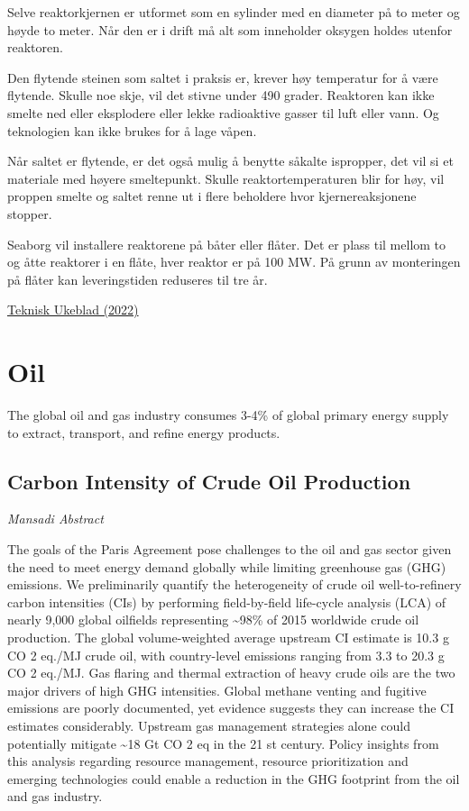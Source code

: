 \documentclass[
]{book}
\begin{document}
Selve reaktorkjernen er utformet som en sylinder med en diameter på to meter og høyde to meter. Når den er i drift må alt som inneholder oksygen holdes utenfor reaktoren.

Den flytende steinen som saltet i praksis er, krever høy temperatur for å være flytende. Skulle noe skje, vil det stivne under 490 grader. Reaktoren kan ikke smelte ned eller eksplodere eller lekke radioaktive gasser til luft eller vann. Og teknologien kan ikke brukes for å lage våpen.

Når saltet er flytende, er det også mulig å benytte såkalte ispropper, det vil si et materiale med høyere smeltepunkt. Skulle reaktortemperaturen blir for høy, vil proppen smelte og saltet renne ut i flere beholdere hvor kjernereaksjonene stopper.

Seaborg vil installere reaktorene på båter eller flåter.
Det er plass til mellom to og åtte reaktorer i en flåte, hver reaktor er på 100 MW. På grunn av monteringen på flåter kan leveringstiden reduseres til tre år.

\href{https://www.tu.no/artikler/seaborg-utvikler-mobile-kjernekraftverk/516722}{Teknisk Ukeblad (2022)}

\hypertarget{oil}{%
\chapter{Oil}\label{oil}}

The global oil and gas industry consumes 3-4\% of global primary energy supply to extract,
transport, and refine energy products.

\hypertarget{carbon-intensity-of-crude-oil-production}{%
\section{Carbon Intensity of Crude Oil Production}\label{carbon-intensity-of-crude-oil-production}}

\emph{Mansadi Abstract}

The goals of the Paris Agreement pose challenges
to the oil and gas sector given the need to meet energy demand globally while limiting
greenhouse gas (GHG) emissions. We preliminarily quantify the heterogeneity of crude oil
well-to-refinery carbon intensities (CIs) by performing field-by-field life-cycle analysis
(LCA) of nearly 9,000 global oilfields representing \textasciitilde98\% of 2015 worldwide crude oil
production. The global volume-weighted average upstream CI estimate is 10.3 g
CO 2 eq./MJ crude oil, with country-level emissions ranging from 3.3 to 20.3 g CO 2 eq./MJ.
Gas flaring and thermal extraction of heavy crude oils are the two major drivers of high
GHG intensities. Global methane venting and fugitive emissions are poorly documented,
yet evidence suggests they can increase the CI estimates considerably. Upstream gas
management strategies alone could potentially mitigate \textasciitilde18 Gt CO 2 eq in the 21 st century.
Policy insights from this analysis regarding resource management, resource prioritization
and emerging technologies could enable a reduction in the GHG footprint from the oil and
gas industry.
\end{document}
